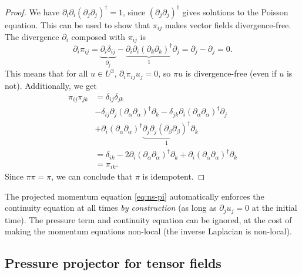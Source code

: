 \documentclass[preprint,twocolumn,5p]{elsarticle}
\begin{document}
\begin{proof}
    We have
    $\partial_i \partial_i (\partial_j \partial_j)^{\dagger} = 1$,
    since $(\partial_j \partial_j)^{\dagger}$ gives solutions to the Poisson equation.
    This can be used to show that $\pi_{i j}$ makes vector fields divergence-free.
    The divergence $\partial_i$ composed with $\pi_{i j}$ is
    \begin{equation}
        \partial_i \pi_{i j}
        = \underbrace{\partial_i \delta_{i j}}_{\partial_j}
        - \underbrace{\partial_i \partial_i (\partial_k \partial_k)^{\dagger}}_{1} \partial_j
        = \partial_j - \partial_j
        = 0.
    \end{equation}
    This means that for all $u \in U^3$,
    $\partial_i \pi_{i j} u_j = 0$,
    so $\pi u$ is divergence-free
    (even if $u$ is not).
    Additionally, we get
    \begin{equation}
        \begin{split}
            \pi_{i j} \pi_{j k}
            & = \delta_{i j} \delta_{j k} \\
            & - \delta_{i j} \partial_{j} (\partial_\alpha \partial_\alpha)^{\dagger} \partial_k
            - \delta_{j k} \partial_{i} (\partial_\alpha \partial_\alpha)^{\dagger} \partial_j \\
            & + \partial_{i}
            (\partial_\alpha \partial_\alpha)^{\dagger}
            \underbrace{\partial_j \partial_{j} (\partial_\beta \partial_\beta)^{\dagger}}_{1}
            \partial_k \\
            & = \delta_{i k} - 2 \partial_{i} (\partial_\alpha \partial_\alpha)^{\dagger}
            \partial_k
            + \partial_{i} (\partial_\alpha \partial_\alpha)^{\dagger} \partial_k \\
            & = \pi_{i k}.
        \end{split}
    \end{equation}
    Since $\pi \pi = \pi$, we can conclude that $\pi$ is idempotent.
\end{proof}

The projected momentum equation \eqref{eq:ns-pi}
automatically enforces the continuity equation at all times
\emph{by construction}
(as long as $\partial_j u_j = 0$ at the initial time).
The pressure term and continuity equation can be ignored,
at the cost of making the momentum equations non-local
(the inverse Laplacian is non-local).

\subsection{Pressure projector for tensor fields}
\end{document}
